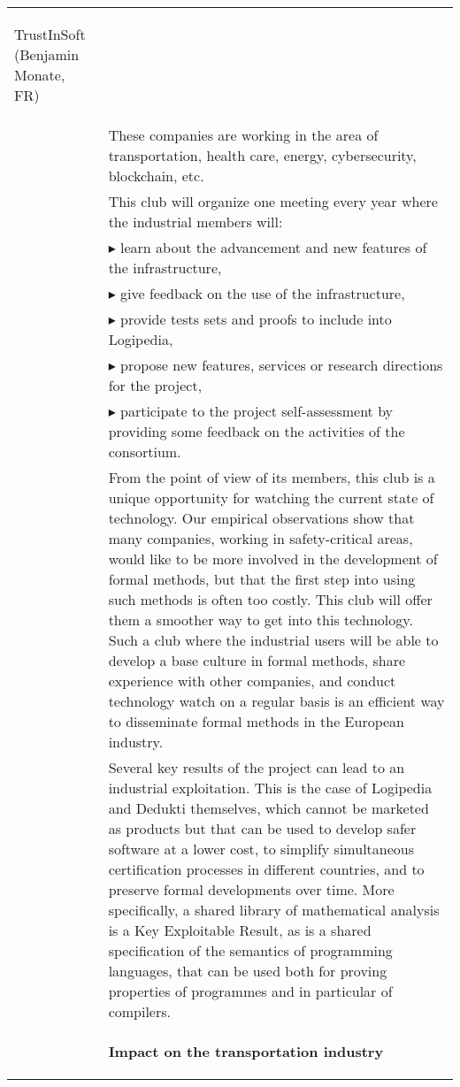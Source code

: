 \begin{longtable}{|p{}|p{}|}
\begin{framed}
\begin{compactitem}
\item TrustInSoft (Benjamin Monate, FR)
\end{compactitem}
\end{framed}\\
&
\hspace{0.4cm}
These companies are working in the area of transportation, health
care, energy, cybersecurity, blockchain, etc.
\\
&
\hspace{0.4cm}
This club will organize one meeting every year where the
industrial members will:\\
&
$\blacktriangleright$
learn about the advancement and new features of the infrastructure,\\
&
$\blacktriangleright$
give feedback on the use of the infrastructure,
\\
&
$\blacktriangleright$ provide tests sets and proofs to include into Logipedia,
\\
&
$\blacktriangleright$ propose new features, services or research directions for the project,
\\
&
$\blacktriangleright$ participate to the project self-assessment by providing
some feedback on the activities of the consortium.\\
&
\hspace{0.4cm}
From the point of view of its members, this club is a unique
opportunity for watching the current state of technology. Our empirical observations show that
many companies, working in safety-critical areas, would like to be
more involved in the development of formal methods, but that the first
step into using such methods is often too costly. This club will offer
them a smoother way to get into this technology. Such a club
where the industrial users will be able to develop a base culture in
formal methods, share experience with other companies, and conduct
technology watch on a regular basis is an efficient way to disseminate
formal methods in the European industry.\\
&
\hspace{0.4cm}
Several key results of the project can lead to an industrial
exploitation. This is the case of Logipedia and Dedukti themselves,
which cannot be marketed as products but that can be used to develop safer
software at a lower cost, to simplify simultaneous certification
processes in different countries, and to preserve formal developments
over time. More specifically, a shared library of mathematical analysis is a Key
Exploitable Result, as is a shared specification of the semantics of
programming languages, that can be used both for proving properties of
programmes and in particular of compilers.\\
&
\begin{framed}
{\bf \Large Impact on the transportation industry}


\end{framed}
\end{longtable}
